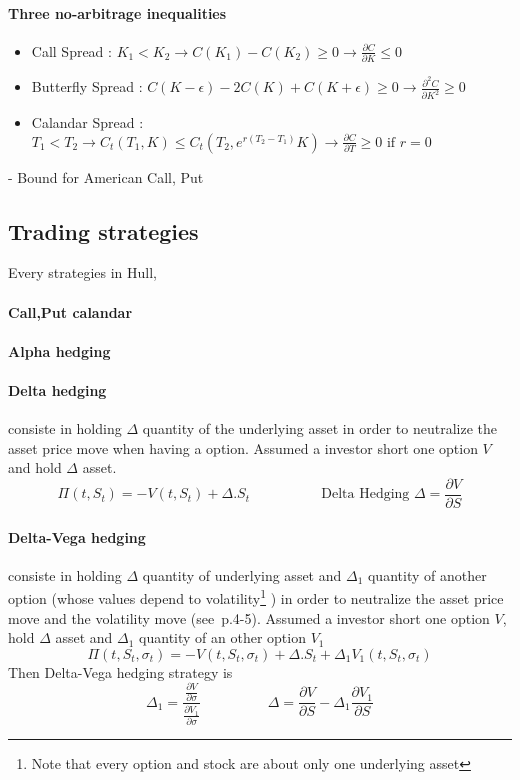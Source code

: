 \documentclass[a4paper,10pt]{article}
\begin{document}
\paragraph{Three no-arbitrage inequalities}
\begin{itemize}
 \item Call Spread : $K_1 < K_2 \rightarrow C(K_1)-C(K_2) \geq 0 \rightarrow \frac{\partial C }{\partial K} \leq 0  $
 \item Butterfly Spread : $C(K-\epsilon) - 2C(K) + C(K+\epsilon) \geq 0 \rightarrow \frac{\partial^2 C }{\partial K^2} \geq 0 $
 \item Calandar Spread : $T_1<T_2  \rightarrow C_{t}(T_1,K) \leq C_{t}(T_2,e^{r(T_2-T_1)} K) \rightarrow \frac{\partial C }{\partial T} \geq 0 \text{ if } r=0 $
\end{itemize}
- Bound for American Call, Put
\subsection{Trading strategies}
Every strategies in Hull,
\paragraph{Call,Put calandar}
\paragraph{Alpha hedging}
\paragraph{Delta hedging} consiste in holding $\Delta$ quantity of the underlying asset in order to neutralize the asset price move when having a option. Assumed a investor short one option $V$ and hold $\Delta$ asset. 
\[
\varPi(t,S_t) = -V(t,S_t) + \Delta.S_t
\hspace{2cm}
\text{ Delta Hedging }
\Delta = \frac{\partial V}{\partial S}
\]
\paragraph{Delta-Vega hedging} consiste in holding $\Delta$ quantity of underlying asset and $\Delta_{1}$ quantity of another option (whose values depend to volatility\footnote{ Note that every option and stock are about only one underlying asset} ) in order to neutralize the asset price move and the volatility move (see~\cite{GATHERAL}p.4-5). Assumed a investor short one option $V$, hold $\Delta$ asset and $\Delta_{1}$ quantity of an other option $V_1$
\[
\varPi(t,S_t,\sigma_t) = -V(t,S_t,\sigma_t) + \Delta.S_t + \Delta_1 V_1(t,S_t,\sigma_t)
\]
Then Delta-Vega hedging strategy is 
\[
\Delta_1 =\frac{\frac{\partial V}{\partial \sigma} }{\frac{\partial V_1}{\partial \sigma} }
\hspace{2cm}
\Delta   =\frac{\partial V}{\partial S} - \Delta_1 \frac{\partial V_1}{\partial S} 
\]
\end{document}
